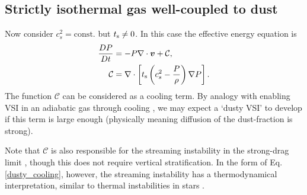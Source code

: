 \subsection{Strictly isothermal gas well-coupled to dust} 
Now consider $c_s^2=\mathrm{const.}$ but $t_\mathrm{s}\neq0$. In this case
the effective energy equation is 
\begin{align}\label{dusty_cooling}
  \frac{DP}{Dt} &= - P \nabla \cdot \bm{v} + \mathcal{C},\\
  \mathcal{C} & = \nabla\cdot\left[t_\mathrm{s}\left(c_s^2 -
    \frac{P}{\rho}\right)\nabla P\right].           
\end{align} 
The function $\mathcal{C}$ can be considered as a cooling term. By
analogy with enabling VSI in an adiabatic gas through cooling
\citep{nelson13,lin15}, we may expect a `dusty VSI' to develop 
if this term is large enough (physically meaning diffusion of the
dust-fraction is strong). 


Note that $\mathcal{C}$ is also responsible for the streaming
instability  in the strong-drag limit \citep{laibe14}, though this
does not require vertical stratification. In the form of
Eq. \ref{dusty_cooling}, however, the streaming instability has a
thermodynamical interpretation, similar to thermal instabilities in
stars \citep{latter06}.  

